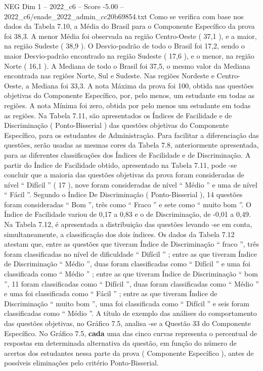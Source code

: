 \begin{textsample}{NEG Dim 1 – 2022\_c6 – Score -5.00 – 2022\_c6/enade\_2022\_admin\_cc20b69854.txt}
Como se verifica com base nos dados da Tabela 7.10, a Média do Brasil para o Componente Específico da prova foi 38,3.
A menor Média foi observada na região Centro-Oeste ( 37,1 ), e a maior, na região Sudeste ( 38,9 ).
O Desvio-padrão de todo o Brasil foi 17,2, sendo o maior Desvio-padrão encontrado na região Sudeste ( 17,6 ), e o menor, na região Norte ( 16,1 ).
A Mediana de todo o Brasil foi 37,5, o mesmo valor da Mediana encontrada nas regiões Norte, Sul e Sudeste.
Nas regiões Nordeste e Centro-Oeste, a Mediana foi 33,3.
A nota Máxima da prova foi 100, obtida nas questões objetivas do Componente Específico, por, pelo menos, um estudante em todas as regiões.
A nota Mínima foi zero, obtida por pelo menos um estudante em todas as regiões.
Na Tabela 7.11, são apresentados os Índices de Facilidade e de Discriminação ( Ponto-Bisserial ) das questões objetivas do Componente Específico, para os estudantes de Administração.
Para facilitar a diferenciação das questões, serão usadas as mesmas cores da Tabela 7.8, anteriormente apresentada, para as diferentes classificações dos Índices de Facilidade e de Discriminação.
A partir do Índice de Facilidade obtido, apresentado na Tabela 7.11, pode -se concluir que a maioria das questões objetivas da prova foram consideradas de nível “ Difícil ” ( 17 ), nove foram consideradas de nível “ Médio ” e uma de nível “ Fácil ”.
Segundo o Índice De Discriminação ( Ponto-Bisserial ), 14 questões foram consideradas “ Bom ”, três como “ Fraco ” e sete como “ muito bom ”.
O Índice de Facilidade variou de 0,17 a 0,83 e o de Discriminação, de -0,01 a 0,49.
Na Tabela 7.12, é apresentada a distribuição das questões levando -se em conta, simultaneamente, a classificação dos dois índices.
Os dados da Tabela 7.12 atestam que, entre as questões que tiveram Índice de Discriminação “ fraco ”, três foram classificadas no nível de dificuldade “ Difícil ” ; entre as que tiveram Índice de Discriminação “ Médio ”, duas foram classificadas como “ Difícil ” e uma foi classificada como “ Médio ” ; entre as que tiveram Índice de Discriminação “ bom ”, 11 foram classificadas como “ Difícil ”, duas foram classificadas como “ Médio ” e uma foi classificada como “ Fácil ” ; entre as que tiveram Índice de Discriminação “ muito bom ”, uma foi classificada como “ Difícil ” e seis foram classificadas como “ Médio ”.
A título de exemplo das análises do comportamento das questões objetivas, no Gráfico 7.5, analisa -se a Questão 33 do Componente Específico.
No Gráfico 7.5, \textbf{cada} uma das cinco curvas representa o percentual de respostas em determinada alternativa da questão, em função do número de acertos dos estudantes nessa parte da prova ( Componente Específico ), antes de possíveis eliminações pelo critério Ponto-Bisserial.

\end{textsample}
